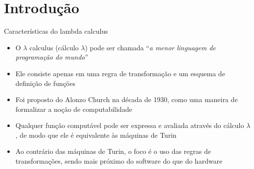 \section{Introdução}

\begin{frame}[fragile]{Características do lambda calculus}

    \begin{itemize}
        \item O $\lambda$ calculus (cálculo $\lambda$) pode ser chamada ``\textit{a menor 
            linguagem de programação do mundo}''

        \item Ele consiste apenas em uma regra de transformação e um esquema de definição de 
            funções

        \item Foi proposto do Alonzo Church na década de 1930, como uma maneira de formalizar a
            noção de computabilidade

        \item Qualquer função computável pode ser expressa e avaliada através do cálculo $\lambda$,
            de modo que ele é equivalente às máquinas de Turin
            
        \item Ao contrário das máquinas de Turin, o foco é o uso das regras de transformações, 
            sendo mais próximo do software do que do hardware
    \end{itemize}

\end{frame}
